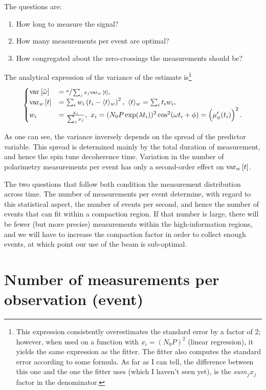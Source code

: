 \documentclass{article}
\begin{document}
The questions are:
\begin{enumerate}
	\item How long to measure the signal?
	\item How many measurements per event are optimal?
	\item How congregated about the zero-crossings the measurements should be?
\end{enumerate}

The analytical expression of the variance of the estimate is\footnote{This expression consistently overestimates the standard error by a factor of 2; however, when used on a function with $x_i = (N_0P)^2$ (linear regression), it yields the same expression as the fitter. The fitter also computes the standard error according to some formula. As far as I can tell, the difference between this one and the one the fitter uses (which I haven't seen yet), is the $sum_j x_j$ factor in the denominator.}
\begin{equation}
\begin{cases}
	\var{\hat\omega} &= \sfrac{\nu}{\sum_j x_j\var[w]{t}}, \\
	\var[w]{t} &= \sum_i w_i \bkt{t_i - \avg{t}_w}^2,~ \avg{t}_w = \sum_i t_i w_i, \\
	w_i &= \frac{x_i}{\sum_j x_j},~ x_i = (N_0P\exp(\lambda t_i))^2\cos^2(\omega t_i + \phi) = \bkt{\mupp}^2.
\end{cases}	
\end{equation}

As one can see, the variance inversely depends on the spread of the predictor variable. This spread is determined mainly by the total duration of measurement, and hence the spin tune decoherence time. Variation in the number of polarimetry measurements per event has only a second-order effect on $\var[w]{t}$.

The two questions that follow both condition the measurement distribution across time. The number of measurements per event determine, with regard to this statistical aspect, the number of events per second, and hence the number of events that can fit within a compaction region. If that number is large, there will be fewer (but more precise) measurements within the high-information regions, and we will have to increase the compaction factor in order to collect enough events, at which point our use of the beam is sub-optimal.

\section{Number of measurements per observation (event)}
\newcommand{\obs}{\epsilon}
\newcommand{\meas}{m}
\newcommand{\Nmo}{n_{\sfrac{\meas}{\obs}}}
\newcommand{\Nozc}{n_{\sfrac{\obs}{zc}}}
\newcommand{\Nzc}{n_{zc}}
\newcommand{\No}{n_{\obs}}
\end{document}
